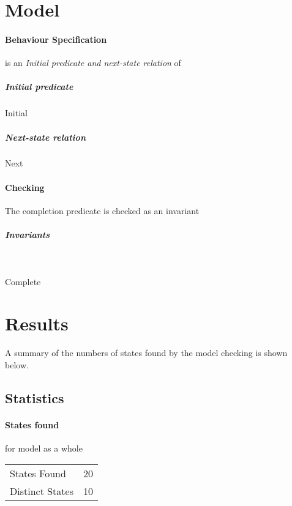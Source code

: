 \documentclass{article}
\begin{document}
\section{Model }

\paragraph{Behaviour Specification}  is an \emph{Initial predicate and next-state
relation} of
\subparagraph{Initial predicate}
\begin{tla}
Initial
\end{tla}
\begin{tlatex}
%
\end{tlatex}
\subparagraph{Next-state relation}
\begin{tla}
Next
\end{tla}
\begin{tlatex}
%
\end{tlatex}

\paragraph{Checking} The completion predicate is checked as an invariant

\subparagraph{Invariants}~
\begin{tla}
\lnot Complete
\end{tla}
\begin{tlatex}
%
\end{tlatex}


\section{Results}
A summary of the numbers of states found by the model checking is shown below.

\subsection{Statistics}
\paragraph{States found} for model as a whole

\begin{table}[h]
\begin{tabular}{lr}
	\hline
	States Found & 20 \\
	Distinct States & 10 \\
\hline
\end{tabular}
\end{table}
\end{document}
